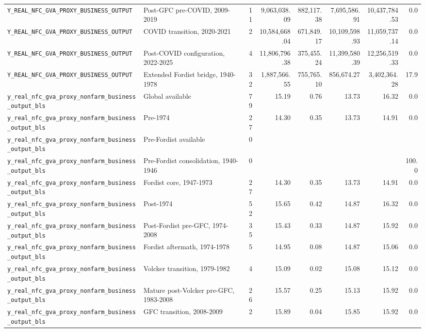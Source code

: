 \begin{landscape}
\begin{longtable}{p{4.4cm}p{3.8cm}rrrrrr}
\\
\nolinkurl{Y_REAL_NFC_GVA_PROXY_BUSINESS_OUTPUT} & Post-GFC pre-COVID, 2009-2019 & 11 & 9,063,038.09 & 882,117.38 & 7,695,586.91 & 10,437,784.53 & 0.0
\\
\nolinkurl{Y_REAL_NFC_GVA_PROXY_BUSINESS_OUTPUT} & COVID transition, 2020-2021 & 2 & 10,584,668.04 & 671,849.17 & 10,109,598.93 & 11,059,737.14 & 0.0
\\
\nolinkurl{Y_REAL_NFC_GVA_PROXY_BUSINESS_OUTPUT} & Post-COVID configuration, 2022-2025 & 4 & 11,806,796.38 & 375,455.24 & 11,399,580.39 & 12,256,519.33 & 0.0
\\
\nolinkurl{Y_REAL_NFC_GVA_PROXY_BUSINESS_OUTPUT} & Extended Fordist bridge, 1940-1978 & 32 & 1,887,566.55 & 755,765.10 & 856,674.27 & 3,402,364.28 & 17.9
\\
\nolinkurl{y_real_nfc_gva_proxy_nonfarm_business_output_bls} & Global available & 79 & 15.19 & 0.76 & 13.73 & 16.32 & 0.0
\\
\nolinkurl{y_real_nfc_gva_proxy_nonfarm_business_output_bls} & Pre-1974 & 27 & 14.30 & 0.35 & 13.73 & 14.91 & 0.0
\\
\nolinkurl{y_real_nfc_gva_proxy_nonfarm_business_output_bls} & Pre-Fordist available & 0 &  &  &  &  &
\\
\nolinkurl{y_real_nfc_gva_proxy_nonfarm_business_output_bls} & Pre-Fordist consolidation, 1940-1946 & 0 &  &  &  &  & 100.0
\\
\nolinkurl{y_real_nfc_gva_proxy_nonfarm_business_output_bls} & Fordist core, 1947-1973 & 27 & 14.30 & 0.35 & 13.73 & 14.91 & 0.0
\\
\nolinkurl{y_real_nfc_gva_proxy_nonfarm_business_output_bls} & Post-1974 & 52 & 15.65 & 0.42 & 14.87 & 16.32 & 0.0
\\
\nolinkurl{y_real_nfc_gva_proxy_nonfarm_business_output_bls} & Post-Fordist pre-GFC, 1974-2008 & 35 & 15.43 & 0.33 & 14.87 & 15.92 & 0.0
\\
\nolinkurl{y_real_nfc_gva_proxy_nonfarm_business_output_bls} & Fordist aftermath, 1974-1978 & 5 & 14.95 & 0.08 & 14.87 & 15.06 & 0.0
\\
\nolinkurl{y_real_nfc_gva_proxy_nonfarm_business_output_bls} & Volcker transition, 1979-1982 & 4 & 15.09 & 0.02 & 15.08 & 15.12 & 0.0
\\
\nolinkurl{y_real_nfc_gva_proxy_nonfarm_business_output_bls} & Mature post-Volcker pre-GFC, 1983-2008 & 26 & 15.57 & 0.25 & 15.13 & 15.92 & 0.0
\\
\nolinkurl{y_real_nfc_gva_proxy_nonfarm_business_output_bls} & GFC transition, 2008-2009 & 2 & 15.89 & 0.04 & 15.85 & 15.92 & 0.0

\end{longtable}
\end{landscape}
